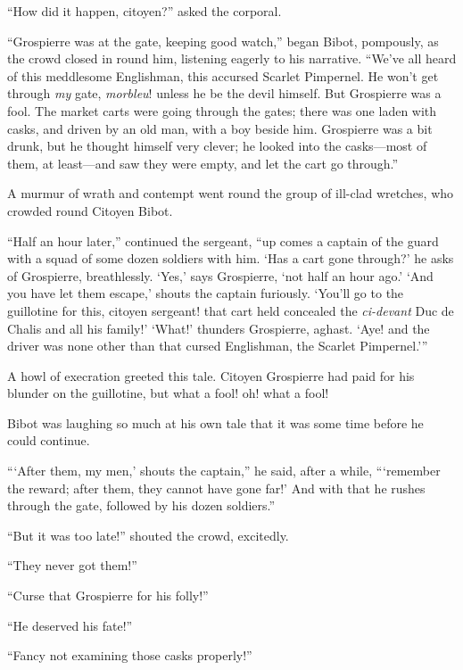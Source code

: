 \documentclass[paper=a5,BCOR=7mm,twoside,DIV=calc,12pt,usegeometry,chapterprefix,endperiod,headings=big]{scrbook}
\begin{document}
\enquote{How did it happen, citoyen?} asked the corporal.

\enquote{Grospierre was at the gate, keeping good watch,} began Bibot, pompously, as the crowd closed in round him, listening eagerly to his narrative. \enquote{We've all heard of this meddlesome Englishman, this accursed Scarlet Pimpernel. He won't get through \textit{my} gate, \textit{morbleu}! unless he be the devil himself. But Grospierre was a fool. The market carts were going through the gates; there was one laden with casks, and driven by an old man, with a boy beside him. Grospierre was a bit drunk, but he thought himself very clever; he looked into the casks---most of them, at least---and saw they were empty, and let the cart go through.}

A murmur of wrath and contempt went round the group of ill-clad wretches, who crowded round Citoyen Bibot.

\enquote{Half an hour later,} continued the sergeant, \enquote{up comes a captain of the guard with a squad of some dozen soldiers with him. \enquote{Has a cart gone through?} he asks of Grospierre, breathlessly. \enquote{Yes,} says Grospierre, \enquote{not half an hour ago.} \enquote{And you have let them escape,} shouts the captain furiously. \enquote{You'll go to the guillotine for this, citoyen sergeant! that cart held concealed the \textit{ci-devant} Duc de Chalis and all his family!} \enquote{What!} thunders Grospierre, aghast. \enquote{Aye! and the driver was none other than that cursed Englishman, the Scarlet Pimpernel.}}

A howl of execration greeted this tale. Citoyen Grospierre had paid for his blunder on the guillotine, but what a fool! oh! what a fool!

Bibot was laughing so much at his own tale that it was some time before he could continue.

\enquote{\enquote{After them, my men,} shouts the captain,} he said, after a while, \enquote{\enquote{remember the reward; after them, they cannot have gone far!} And with that he rushes through the gate, followed by his dozen soldiers.}

\enquote{But it was too late!} shouted the crowd, excitedly.

\enquote{They never got them!}

\enquote{Curse that Grospierre for his folly!}

\enquote{He deserved his fate!}

\enquote{Fancy not examining those casks properly!}
\end{document}
